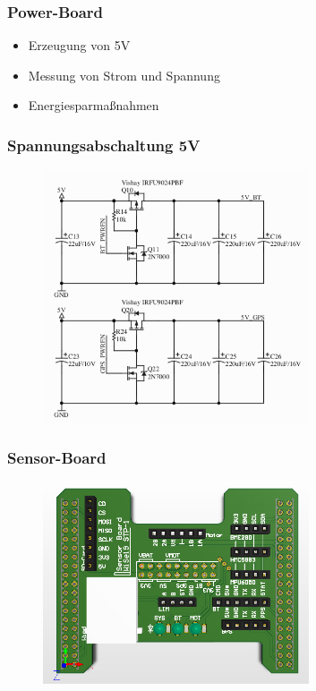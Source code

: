 \documentclass{beamer}
\begin{document}
\begin{frame}
  \frametitle{Power-Board}
	\begin{itemize}
		\item Erzeugung von 5V
		\item Messung von Strom und Spannung
		\item Energiesparmaßnahmen
	\end{itemize}

\end{frame}

\begin{frame}
	\frametitle{Spannungsabschaltung 5V}
	 \begin{figure}[H]
    		\centering
   		 \includegraphics[width=0.7\textwidth]{./img/spannungsabschaltung.png}
 	 \end{figure}

\end{frame}


\begin{frame}
	\frametitle{Sensor-Board}
	 \begin{figure}[H]
    		\centering
    		\includegraphics[width=0.7\textwidth]{./img/PCB_Sensors_3D_top.PNG}
  	 \end{figure}
\end{frame}
\end{document}
